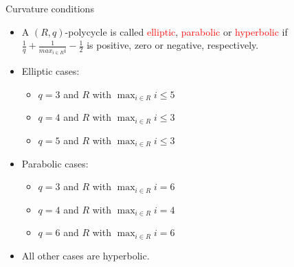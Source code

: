 \documentclass[%
pdf,
colorBG,
slideColor,
]{prosper}
\begin{document}
\begin{slide}{Curvature conditions}
\begin{itemize}
\item A $(R,q)$-polycycle is called \textcolor{red}{elliptic}, \textcolor{red}{parabolic} or \textcolor{red}{hyperbolic} if $\frac{1}{q} + \frac{1}{max_{i \in R}i} - \frac{1}{2}$ is positive, zero or negative, respectively.
\item Elliptic cases:
\begin{itemize}
\item $q=3$ and $R$ with $\max_{i\in R}i\leq 5$
\item $q=4$ and $R$ with $\max_{i\in R}i\leq 3$
\item $q=5$ and $R$ with $\max_{i\in R}i\leq 3$
\end{itemize}
\item Parabolic cases:
\begin{itemize}
\item $q=3$ and $R$ with $\max_{i\in R}i = 6$
\item $q=4$ and $R$ with $\max_{i\in R}i = 4$
\item $q=6$ and $R$ with $\max_{i\in R}i = 6$
\end{itemize}
\item All other cases are hyperbolic.
\end{itemize}
\end{slide}
\end{document}
